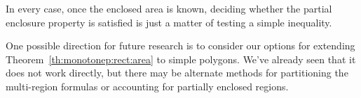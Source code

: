 In every case, once the enclosed area is known, deciding whether the partial enclosure property is satisfied is just a matter of testing a simple inequality.

One possible direction for future research is to consider our options for extending Theorem~\ref{th:monotonep:rect:area} to simple polygons. 
We've already seen that it does not work directly, but there may be alternate methods for partitioning the multi-region formulas or accounting for partially enclosed regions.
